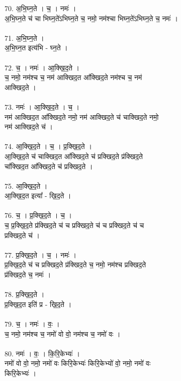 70. अ॒भि॒घ्न॒ते । च॒ । नमः॑ ।\\
अ॒भि॒घ्न॒ते च॑ चा भिघ्न॒ते॑ऽभिघ्न॒ते च॒ नमो॒ नम॑श्चा भिघ्न॒ते॑ऽभिघ्न॒ते च॒ नमः॑ ।\\
\\
71. अ॒भि॒घ्न॒ते ।\\
अ॒भि॒घ्न॒त इत्य॑भि - घ्न॒ते ।\\
\\
72. च॒ । नमः॑ । आ॒क्खि॒द॒ते ।\\
च॒ नमो॒ नम॑श्च च॒ नम॑ आक्खिद॒त आ᳚क्खिद॒ते नम॑श्च च॒ नम॑\\
आक्खिद॒ते ।\\
\\
73. नमः॑ । आ॒क्खि॒द॒ते । च॒ ।\\
नम॑ आक्खिद॒त आ᳚क्खिद॒ते नमो॒ नम॑ आक्खिद॒ते च॑ चाक्खिद॒ते नमो॒\\
नम॑ आक्खिद॒ते च॑ ।\\
\\
74. आ॒क्खि॒द॒ते । च॒ । प्र॒क्खि॒द॒ते ।\\
आ॒क्खि॒द॒ते च॑ चाक्खिद॒त आ᳚क्खिद॒ते च॑ प्रक्खिद॒ते प्र॑क्खिद॒ते\\
चा᳚क्खिद॒त आ᳚क्खिद॒ते च॑ प्रक्खिद॒ते ।\\
\\
75. आ॒क्खि॒द॒ते ।\\
आ॒क्खि॒द॒त इत्या᳚ - खि॒द॒ते ।\\
\\
76. च॒ । प्र॒क्खि॒द॒ते । च॒ ।\\
च॒ प्र॒क्खि॒द॒ते प्र॑क्खिद॒ते च॑ च प्रक्खिद॒ते च॑ च प्रक्खिद॒ते च॑ च\\
प्रक्खिद॒ते च॑ ।\\
\\
77. प्र॒क्खि॒द॒ते । च॒ । नमः॑ ।\\
प्र॒क्खि॒द॒ते च॑ च प्रक्खिद॒ते प्र॑क्खिद॒ते च॒ नमो॒ नम॑श्च प्रक्खिद॒ते\\
प्र॑क्खिद॒ते च॒ नमः॑ ।\\
\\
78. प्र॒क्खि॒द॒ते ।\\
प्र॒क्खि॒द॒त इति॑ प्र - खि॒द॒ते ।\\
\\
79. च॒ । नमः॑ । वः॒ ।\\
च॒ नमो॒ नम॑श्च च॒ नमो॑ वो वो॒ नम॑श्च च॒ नमो॑ वः ।\\
\\
80. नमः॑ । वः॒ । कि॒रि॒केभ्यः॑ ।\\
नमो॑ वो वो॒ नमो॒ नमो॑ वः किरि॒केभ्यः॑ किरि॒केभ्यो॑ वो॒ नमो॒ नमो॑ वः\\
किरि॒केभ्यः॑ ।\\
